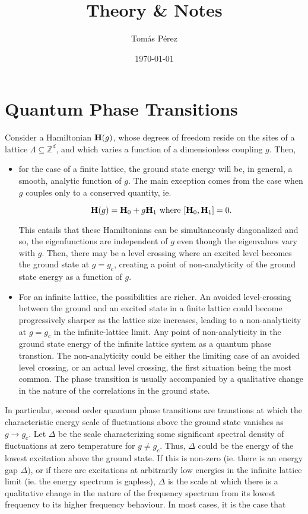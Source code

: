 \documentclass{homework}
\author{Tomás Pérez}
\date{\today}
\title{Theory \& Notes}
\begin{document}
 \maketitle

\section{Quantum Phase Transitions}

Consider a Hamiltonian ${\bf H}(g)$, whose degrees of freedom reside on the sites of a lattice $\Lambda \subseteq \mathds{Z}^d$, and which varies a function of a dimensionless coupling $g$. Then,

\begin{itemize}
    \item for the case of a finite lattice, the ground state energy will be, in general, a smooth, analytic function of $g$. The main exception comes from the case when $g$ couples only to a conserved quantity, ie.
    
    $$
        {\bf H}(g) = {\bf H}_0 + g {\bf H}_1 \textnormal{ where } [{\bf H}_0, {\bf H}_1] = 0.  
    $$
    
    This entails that these Hamiltonians can be simultaneously diagonalized and so, the eigenfunctions are independent of $g$ even though the eigenvalues vary with $g$. Then, there may be a level crossing where an excited level becomes the ground state at $g = g_c$, creating a point of non-analyticity of the ground state energy as a function of $g$. \\
    
    \item For an infinite lattice, the possibilities are richer. An avoided level-crossing between the ground and an excited state in a finite lattice could become progressively sharper as the lattice size increases, leading to a non-analyticity at $g = g_c$ in the infinite-lattice limit. Any point of non-analyticity in the ground state energy of the infinite lattice system as a quantum phase transtion. The non-analyticity could be either the limiting case of an avoided level crossing, or an actual level crossing, the first situation being the most common. The phase transition is usually accompanied by a qualitative change in the nature of the correlations in the ground state. \\
\end{itemize}

In particular, second order quantum phase transitions are transtions at which the characteristic energy scale of fluctuations above the ground state vanishes as $g \rightarrow g_c$. Let $\Delta$ be the scale characterizing some significant spectral density of fluctuations at zero temperature for $g \neq g_c$. Thus, $\Delta$ could be the energy of the lowest excitation above the ground state. If this is non-zero (ie. there is an energy gap $\Delta)$, or if there are excitations at arbitrarily low energies in the infinite lattice limit (ie. the energy spectrum is gapless), $\Delta$ is the scale at which there is a qualitative change in the nature of the frequency spectrum from its lowest frequency to its higher frequency behaviour. In most cases, it is the case that 
\end{document}
